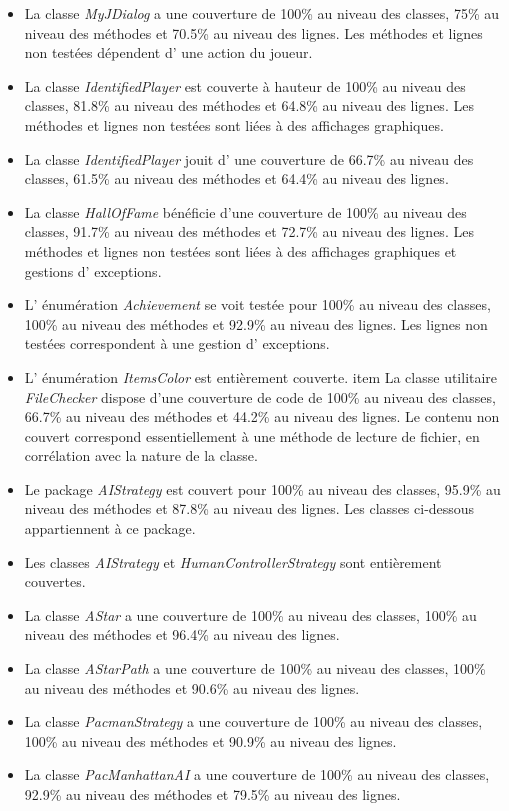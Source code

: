 \documentclass[12pt, openany]{report}
\begin{document}
\begin{itemize}
	\item La classe \mbox{\textit{MyJDialog}} a une couverture de 100\% au niveau des classes, 75\% au niveau des méthodes et 70.5\% au niveau des lignes. Les méthodes et lignes non testées dépendent d' une action du joueur.
	\item La classe \mbox{\textit{IdentifiedPlayer}} est couverte à hauteur de 100\% au niveau des classes, 81.8\% au niveau des méthodes et 64.8\% au niveau des lignes. Les méthodes et lignes non testées sont liées à des affichages graphiques.
	\item La classe \mbox{\textit{IdentifiedPlayer}} jouit d' une couverture de 66.7\% au niveau des classes, 61.5\% au niveau des méthodes et 64.4\% au niveau des lignes. %
	\item La classe \mbox{\textit{HallOfFame}} bénéficie d'une couverture de 100\% au niveau des classes, 91.7\% au niveau des méthodes et 72.7\% au niveau des lignes. Les méthodes et lignes non testées sont liées à des affichages graphiques et gestions d' exceptions.
	\item L' énumération \mbox{\textit{Achievement}} se voit testée pour 100\% au niveau des classes, 100\% au niveau des méthodes et 92.9\% au niveau des lignes. Les lignes non testées correspondent à une gestion d' exceptions.
	\item L' énumération \mbox{\textit{ItemsColor}} est entièrement couverte.
	item La classe utilitaire \mbox{\textit{FileChecker}} dispose d'une couverture de code de 100\% au niveau des classes, 66.7\% au niveau des méthodes et 44.2\% au niveau des lignes. Le contenu non couvert correspond essentiellement à une méthode de lecture de fichier, en corrélation avec la nature de la classe.
	\item Le package \mbox{\textit{AIStrategy}} est couvert pour 100\% au niveau des classes, 95.9\% au niveau des méthodes et 87.8\% au niveau des lignes. Les classes ci-dessous appartiennent à ce package.
	\item Les classes \mbox{\textit{AIStrategy}} et \mbox{\textit{HumanControllerStrategy}} sont entièrement couvertes.
	\item La classe \mbox{\textit{AStar}} a une couverture de 100\% au niveau des classes, 100\% au niveau des méthodes et 96.4\% au niveau des lignes.
	\item La classe \mbox{\textit{AStarPath}} a une couverture de 100\% au niveau des classes, 100\% au niveau des méthodes et 90.6\% au niveau des lignes.
	\item La classe \mbox{\textit{PacmanStrategy}} a une couverture de 100\% au niveau des classes, 100\% au niveau des méthodes et 90.9\% au niveau des lignes.
	\item La classe \mbox{\textit{PacManhattanAI}} a une couverture de 100\% au niveau des classes, 92.9\% au niveau des méthodes et 79.5\% au niveau des lignes. %
\end{itemize}
\end{document}
